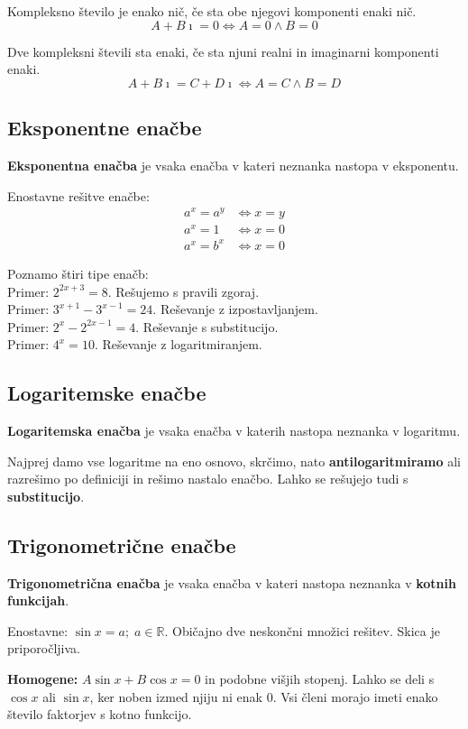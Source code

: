 \documentclass[a4paper,oneside,12pt,fleqn]{article}
\def\R{\ensuremath{\mathbb R}}
\newcommand{\ii}{\ensuremath{\imath}}
\newcommand\kos\cos
\renewcommand\iff\Leftrightarrow
\numberwithin{equation}{section}
\begin{document}
Kompleksno število je enako nič, če sta obe njegovi komponenti enaki nič.
\[ A + B\ii = 0 \iff A = 0 \land B = 0 \]

Dve kompleksni števili sta enaki, če sta njuni realni in imaginarni komponenti enaki.
\[ A + B\ii = C + D\ii \iff A = C \land B = D \]

\subsection{Eksponentne enačbe}
\label{sec:enac:eks}
\textbf{Eksponentna enačba} je vsaka enačba v kateri neznanka nastopa v eksponentu.

Enostavne rešitve enačbe:
\begin{align*}
  a^x = a^y &\iff x = y \\
  a^x = 1 &\iff x = 0 \\
  a^x = b^x &\iff x = 0
\end{align*}

Poznamo štiri tipe enačb: \\
Primer: $2^{2x+3} = 8$. Rešujemo s pravili zgoraj.\\
Primer: $3^{x+1} - 3^{x-1} = 24$. Reševanje z izpostavljanjem.\\
Primer: $2^x - 2^{2x-1} = 4$. Reševanje s substitucijo.\\
Primer: $4^x = 10$. Reševanje z logaritmiranjem.

\subsection{Logaritemske enačbe}
\label{sec:enac:log}
\textbf{Logaritemska enačba} je vsaka enačba v katerih nastopa neznanka v logaritmu.

Najprej damo vse logaritme na eno osnovo, skrčimo, nato \textbf{antilogaritmiramo} ali razrešimo po
definiciji in rešimo nastalo enačbo. Lahko se rešujejo tudi s \textbf{substitucijo}.

\subsection{Trigonometrične enačbe}
\label{sec:enac:trig}
\textbf{Trigonometrična enačba} je vsaka enačba v kateri nastopa neznanka v \textbf{kotnih funkcijah}.

Enostavne: $\sin x = a; \; a \in \R$. Običajno dve neskončni množici rešitev. Skica je
priporočljiva.

\textbf{Homogene:} $A\sin x + B\kos x = 0$ in podobne višjih stopenj. Lahko se deli s $\kos x$ ali
$\sin x$, ker noben izmed njiju ni enak 0. Vsi členi morajo imeti enako število faktorjev
s kotno funkcijo.
\end{document}

